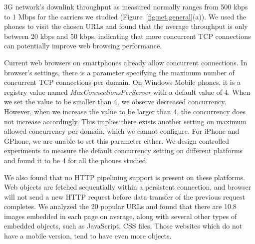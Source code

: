 \label{sec:web_parallel}

3G network's downlink throughput as measured normally ranges from 500 
kbps to 1 Mbps for the carriers we studied (Figure~\ref{fig:net.general}(a)). 
We used the phones to visit the chosen URLs and found that the average 
throughput is only between 20 kbps and 50 kbps, indicating that 
more concurrent TCP connections can potentially improve web browsing 
performance.

Current web browsers on smartphones already allow concurrent 
connections. In browser's settings, there is a parameter specifying 
the maximum number of concurrent TCP connections per domain. On 
Windows Mobile phones, it is a registry value named 
{\em MaxConnectionsPerServer} with a default value of 4. When we 
set the value to be smaller than 4, we observe decreased 
concurrency. However, when we increase the value to be larger than 
4, the concurrency does not increase accordingly. This implies there 
exists another setting on maximum allowed concurrency per domain, 
which we cannot configure. For iPhone and GPhone, we are unable to 
set this parameter either. We design controlled experiments to measure 
the default concurrency setting on different platforms and found it 
to be 4 for all the phones studied. 

We also found that no HTTP 
pipelining support is present on these platforms.
Web objects are fetched sequentially within a persistent connection,
and browser will not send a new HTTP request before data transfer
of the previous request completes. %
We analyzed the 20 popular URLs and found that there are 10.8 images 
embedded in each page on average, along with several other types of 
embedded objects, such as JavaScript, CSS files, \etc Those websites 
which do not have a mobile version, tend to have even more objects. 

